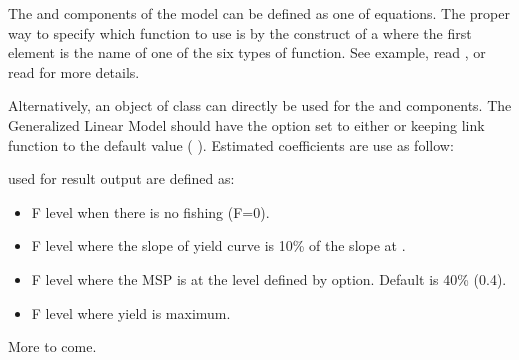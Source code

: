 \documentclass[a4paper]{book}
\begin{document}
\begin{Details}
The  and  components of the model can be defined 
as one of  equations. The proper 
way to specify which function to use is by the construct of a  where the first element is the 
name of one of the six types of function. See example, read , or read  
for more details.   

Alternatively, an object of class  can directly be used for the  and  components. 
The Generalized Linear Model should have  the option  set to either  or  keeping link function to the 
default value ( ).
Estimated coefficients are use as follow: 



 used for result output are defined as:
\begin{itemize}

\item {}  F level when there is no fishing (F=0).
\item {}    F level where the slope of yield curve is 10\% of the slope at . 
\item {}    F level where the MSP is at the level defined by  option. Default is 40\% (0.4).
\item {}   F level where yield is maximum.

\end{itemize}


More to come.
\end{Details}
%
\end{document}
